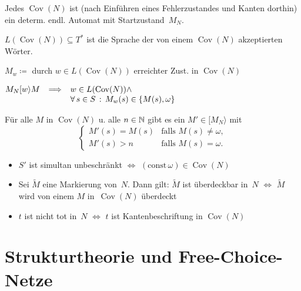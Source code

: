 \documentclass{cheat-sheet}
\newcommand{\activeTransition}[1]{[{#1}\rangle} %
\DeclareMathOperator{\Cov}{Cov} %
\begin{document}
\begin{bem}
  Jedes $\Cov(N)$ ist (nach Einführen eines Fehlerzustandes und Kanten dorthin) ein determ. endl. Automat mit Startzustand~$M_N$.
\end{bem}

\begin{defn}
  $L(\Cov(N)) \subseteq T^*$ ist die Sprache der von einem $\Cov(N)$ akzeptierten Wörter. 
\end{defn}

\begin{nota}
  $M_w \coloneqq $ durch $w \in L(\Cov(N))$ erreichter Zust. in $\Cov(N)$
\end{nota}

\begin{lem}
  $
    M_N \activeTransition{w} M \enspace \implies
    \begin{array}[t]{l}
      w \in L(\Cov(N)) \wedge \\
      \fa{s \in S} M_w(s) \in \{ M(s), \omega \}
    \end{array}
  $
\end{lem}

\begin{lem}
  Für alle $M$ in $\Cov(N)$ u. alle $n \in \mathbb{N}$ gibt es ein $M' \!\in\! \activeTransition{M_N}$ mit
  \[
    \begin{cases}
      M'(s) = M(s) & \text{falls } M(s) \neq \omega, \\
      M'(s) > n & \text{falls } M(s) = \omega.
    \end{cases}
  \]
\end{lem}

\begin{kor}
  \begin{itemize}
    \item $S'$ ist simultan unbeschränkt $\iff$ $(\mathrm{const} \, \omega) \in \Cov(N)$
    \item Sei $\tilde{M}$ eine Markierung von~$N$. Dann gilt: $\tilde{M}$ ist überdeckbar in~$N$ $\iff$ $\tilde{M}$ wird von einem $M$ in~$\Cov(N)$ überdeckt
    \item $t$ ist nicht tot in~$N$ $\iff$ $t$ ist Kantenbeschriftung in $\Cov(N)$
  \end{itemize}
\end{kor}

\section{Strukturtheorie und Free-Choice-Netze}
\end{document}

